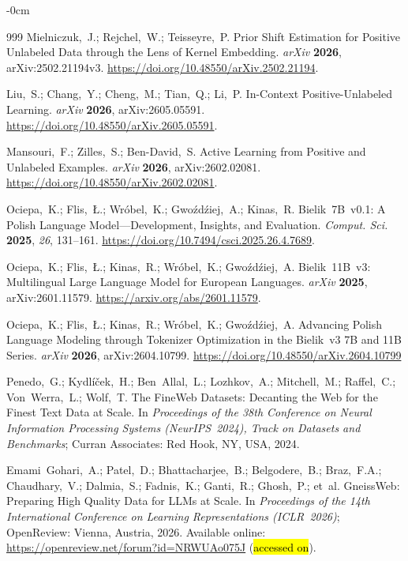 \documentclass[applsci,article,accept,pdftex,moreauthors]{Definitions/mdpi}
\begin{document}
\begin{adjustwidth}{-\extralength}{0cm}
\begin{thebibliography}{999}
Mielniczuk,~J.; Rejchel,~W.; Teisseyre,~P.
Prior Shift Estimation for Positive Unlabeled Data through the Lens of Kernel Embedding.
\textit{arXiv} \textbf{2026}, arXiv:2502.21194v3.
\url{https://doi.org/10.48550/arXiv.2502.21194}.

Liu,~S.; Chang,~Y.; Cheng,~M.; Tian,~Q.; Li,~P.
In-Context Positive-Unlabeled Learning.
\textit{arXiv} \textbf{2026}, arXiv:2605.05591.
\url{https://doi.org/10.48550/arXiv.2605.05591}.

Mansouri,~F.; Zilles,~S.; Ben-David,~S.
Active Learning from Positive and Unlabeled Examples.
\textit{arXiv} \textbf{2026}, arXiv:2602.02081.
\url{https://doi.org/10.48550/arXiv.2602.02081}.

Ociepa,~K.; Flis,~{\L}.; Wr\'{o}bel,~K.; Gwo\'{z}d\'{z}iej,~A.; Kinas,~R.
Bielik~7B~v0.1: A Polish Language Model---Development, Insights, and Evaluation.
\textit{Comput. Sci.} \textbf{2025}, \textit{26}, 131--161.
\url{https://doi.org/10.7494/csci.2025.26.4.7689}.

Ociepa,~K.; Flis,~{\L}.; Kinas,~R.; Wr\'{o}bel,~K.; Gwo\'{z}d\'{z}iej,~A.
Bielik~11B~v3: Multilingual Large Language Model for European Languages.
\textit{arXiv} \textbf{2025}, arXiv:2601.11579.
\url{https://arxiv.org/abs/2601.11579}.

Ociepa,~K.; Flis,~{\L}.; Kinas,~R.; Wr\'{o}bel,~K.; Gwo\'{z}d\'{z}iej,~A.
Advancing Polish Language Modeling through Tokenizer Optimization
in the Bielik~v3 7B and 11B Series.
\textit{arXiv} \textbf{2026}, arXiv:2604.10799.
\url{https://doi.org/10.48550/arXiv.2604.10799}

Penedo,~G.; Kydl\'{i}\v{c}ek,~H.; Ben~Allal,~L.; Lozhkov,~A.; Mitchell,~M.;
Raffel,~C.; Von~Werra,~L.; Wolf,~T.
The FineWeb Datasets: Decanting the Web for the Finest Text Data at Scale.
In \textit{Proceedings of the 38th Conference on Neural Information Processing
Systems (NeurIPS~2024), Track on Datasets and Benchmarks};
Curran Associates: Red Hook, NY, USA, 2024.

Emami~Gohari,~A.; Patel,~D.; Bhattacharjee,~B.; Belgodere,~B.; Braz,~F.A.;
Chaudhary,~V.; Dalmia,~S.; Fadnis,~K.; Ganti,~R.; Ghosh,~P.; et~al.
GneissWeb: Preparing High Quality Data for LLMs at Scale.
In \textit{Proceedings of the 14th International Conference on Learning
Representations (ICLR~2026)};
OpenReview: Vienna, Austria, 2026. Available online: \url{https://openreview.net/forum?id=NRWUAo075J} (\hl{accessed on}). %


\end{thebibliography}
\end{adjustwidth}
\end{document}
